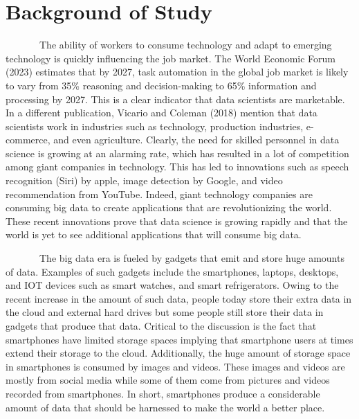 \documentclass[
  12pt,
]{report}
\begin{document}
\vspace{-1em}

\section{Background of Study}\label{background-of-study}

~~~~~~~The ability of workers to consume technology and adapt to
emerging technology is quickly influencing the job market. The World
Economic Forum (2023) estimates that by 2027, task automation in the
global job market is likely to vary from 35\% reasoning and
decision-making to 65\% information and processing by 2027. This is a
clear indicator that data scientists are marketable. In a different
publication, Vicario and Coleman (2018) mention that data scientists
work in industries such as technology, production industries,
e-commerce, and even agriculture. Clearly, the need for skilled
personnel in data science is growing at an alarming rate, which has
resulted in a lot of competition among giant companies in technology.
This has led to innovations such as speech recognition (Siri) by apple,
image detection by Google, and video recommendation from YouTube.
Indeed, giant technology companies are consuming big data to create
applications that are revolutionizing the world. These recent
innovations prove that data science is growing rapidly and that the
world is yet to see additional applications that will consume big data.

~~~~~~~The big data era is fueled by gadgets that emit and store huge
amounts of data. Examples of such gadgets include the smartphones,
laptops, desktops, and IOT devices such as smart watches, and smart
refrigerators. Owing to the recent increase in the amount of such data,
people today store their extra data in the cloud and external hard
drives but some people still store their data in gadgets that produce
that data. Critical to the discussion is the fact that smartphones have
limited storage spaces implying that smartphone users at times extend
their storage to the cloud. Additionally, the huge amount of storage
space in smartphones is consumed by images and videos. These images and
videos are mostly from social media while some of them come from
pictures and videos recorded from smartphones. In short, smartphones
produce a considerable amount of data that should be harnessed to make
the world a better place.
\end{document}
